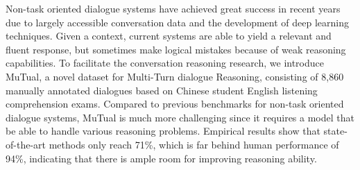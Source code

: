 Non-task oriented dialogue systems have achieved great success in recent years due to largely accessible conversation data and the development of deep learning techniques. Given a context, current systems are able to yield a relevant and fluent response, but  sometimes make logical mistakes because of  weak reasoning capabilities. To facilitate the conversation reasoning research, we introduce MuTual, a novel dataset for Multi-Turn dialogue Reasoning, consisting of 8,860 manually annotated dialogues based on Chinese student English listening comprehension exams. Compared to previous benchmarks for non-task oriented dialogue systems, MuTual is much more challenging since it requires a model that be able to handle various reasoning problems. Empirical results show that state-of-the-art methods only reach 71\%, which is far behind human performance of 94\%, indicating that there is ample room for improving reasoning ability.
